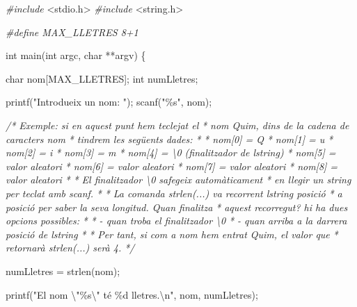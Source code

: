 \documentclass[]{book}
\newenvironment{Shaded}{\begin{snugshade}}{\end{snugshade}}
\newcommand{\CommentTok}[1]{\textcolor[rgb]{0.56,0.35,0.01}{\textit{#1}}}
\newcommand{\DataTypeTok}[1]{\textcolor[rgb]{0.13,0.29,0.53}{#1}}
\newcommand{\ImportTok}[1]{#1}
\newcommand{\NormalTok}[1]{#1}
\newcommand{\PreprocessorTok}[1]{\textcolor[rgb]{0.56,0.35,0.01}{\textit{#1}}}
\newcommand{\SpecialCharTok}[1]{\textcolor[rgb]{0.00,0.00,0.00}{#1}}
\newcommand{\StringTok}[1]{\textcolor[rgb]{0.31,0.60,0.02}{#1}}
\begin{document}
\begin{Shaded}
\begin{Highlighting}[]
\PreprocessorTok{\#include }\ImportTok{\textless{}stdio.h\textgreater{}}
\PreprocessorTok{\#include }\ImportTok{\textless{}string.h\textgreater{}}

\PreprocessorTok{\#define MAX\_LLETRES 8+1}

\DataTypeTok{int}\NormalTok{ main(}\DataTypeTok{int}\NormalTok{ argc, }\DataTypeTok{char}\NormalTok{ **argv) \{}

    \DataTypeTok{char}\NormalTok{ nom[MAX\_LLETRES];}
    \DataTypeTok{int}\NormalTok{ numLletres;}

\NormalTok{    printf(}\StringTok{"Introdueix un nom: "}\NormalTok{);}
\NormalTok{    scanf(}\StringTok{"\%s"}\NormalTok{, nom);}

    \CommentTok{/* Exemple: si en aquest punt hem teclejat el}
\CommentTok{     * nom Quim, dins de la cadena de caracters nom}
\CommentTok{     * tindrem les següents dades:}
\CommentTok{     *}
\CommentTok{     * nom[0] = \textquotesingle{}Q\textquotesingle{}}
\CommentTok{     * nom[1] = \textquotesingle{}u\textquotesingle{}}
\CommentTok{     * nom[2] = \textquotesingle{}i\textquotesingle{}}
\CommentTok{     * nom[3] = \textquotesingle{}m\textquotesingle{}}
\CommentTok{     * nom[4] = \textquotesingle{}\textbackslash{}0\textquotesingle{} (finalitzador de l\textquotesingle{}string)}
\CommentTok{     * nom[5] = valor aleatori}
\CommentTok{     * nom[6] = valor aleatori}
\CommentTok{     * nom[7] = valor aleatori}
\CommentTok{     * nom[8] = valor aleatori}
\CommentTok{     *}
\CommentTok{     * El finalitzador \textquotesingle{}\textbackslash{}0\textquotesingle{} s\textquotesingle{}afegeix automàticament}
\CommentTok{     * en llegir un string per teclat amb scanf.}
\CommentTok{     * }
\CommentTok{     * La comanda strlen(...) va recorrent l\textquotesingle{}string posició}
\CommentTok{     * a posició per saber la seva longitud. Quan finalitza}
\CommentTok{     * aquest recorregut? hi ha dues opcions possibles:}
\CommentTok{     *}
\CommentTok{     * {-} quan troba el finalitzador \textquotesingle{}\textbackslash{}0\textquotesingle{}}
\CommentTok{     * {-} quan arriba a la darrera posició de l\textquotesingle{}string}
\CommentTok{     *}
\CommentTok{     * Per tant, si com a nom hem entrat Quim, el valor que }
\CommentTok{     * retornarà strlen(...) serà 4.}
\CommentTok{     */}

\NormalTok{    numLletres = strlen(nom);}

\NormalTok{    printf(}\StringTok{"El nom }\SpecialCharTok{\textbackslash{}"}\StringTok{\%s}\SpecialCharTok{\textbackslash{}"}\StringTok{ té \%d lletres.}\SpecialCharTok{\textbackslash{}n}\StringTok{"}\NormalTok{, nom, numLletres);}


\end{Highlighting}
\end{Shaded}
\end{document}
